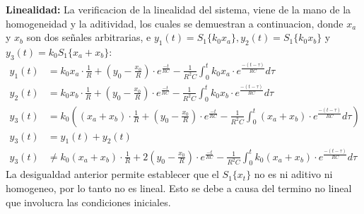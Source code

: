 \documentclass[12pt,a4paper]{report}
\begin{document}
\begin{enumerate}[label=\alph*)]
      \textbf{Linealidad:} La verificacion de la linealidad del sistema, viene de la mano de la homogeneidad y la aditividad,
      los cuales se demuestran a continuacion, donde $x_a$ y $x_b$ son dos señales arbitrarias, e $y_1(t) = S_1\{k_0x_a\},
      y_2(t) = S_1\{k_0x_b\}$ y $y_3(t) = k_0S_1\{x_a + x_b\}$:
      \begin{align*}
        y_1(t) &= k_0x_a \cdot \frac{1}{R} + \left(y_0 - \frac{x_0}{R}\right) \cdot
          e^{\frac{-t}{RC}} - \frac{1}{R^2C} \int_{0}^{t} k_0x_a \cdot e^{\frac{-(t-\tau)}{RC}} d\tau\\[12pt]
        y_2(t) &= k_0x_b \cdot \frac{1}{R} + \left(y_0 - \frac{x_0}{R}\right) \cdot
          e^{\frac{-t}{RC}} - \frac{1}{R^2C} \int_{0}^{t} k_0x_b \cdot e^{\frac{-(t-\tau)}{RC}} d\tau\\[12pt]
        y_3(t) &= k_0\left((x_a + x_b) \cdot \frac{1}{R} + \left(y_0 - \frac{x_0}{R}\right) \cdot e^{\frac{-t}{RC}} -
          \frac{1}{R^2C} \int_{0}^{t} (x_a + x_b) \cdot e^{\frac{-(t-\tau)}{RC}} d\tau\right)\\[12pt]
        y_3(t) &= y_1(t) + y_2(t)\\[6pt]
        y_3(t) &\neq k_0(x_a + x_b) \cdot \frac{1}{R} + 2\left(y_0 - \frac{x_0}{R}\right) \cdot
          e^{\frac{-t}{RC}} - \frac{1}{R^2C} \int_{0}^{t} k_0(x_a + x_b) \cdot e^{\frac{-(t-\tau)}{RC}} d\tau
      \end{align*}
      La desigualdad anterior permite establecer que el $S_1\{x_t\}$ no es ni aditivo ni homogeneo, por lo tanto no es
      lineal. Esto se debe a causa del termino no lineal que involucra las condiciones iniciales.\\


\end{enumerate}
\end{document}
